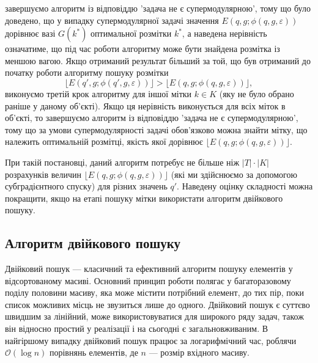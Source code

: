 \begin{enumerate}
\begin{equation}
    \end{equation}
    завершуємо алгоритм із відповіддю 'задача не є супермодулярною', тому що
    було доведено, що у випадку супермодулярної задачі значення $E(q,g;\phi(q,g,\varepsilon))$ дорівнює 
    вазі $G(k^*)$ оптимальної розмітки $k^*$, а наведена нерівність означатиме, що під час роботи алгоритму може бути знайдена 
    розмітка із меншою вагою. Якщо отриманий результат більший за той, що був отриманий до початку роботи алгоритму пошуку розмітки
    \begin{equation}
        \lfloor E(q',g;\phi(q',g,\varepsilon))\rfloor > \lfloor E(q,g;\phi(q,g,\varepsilon))\rfloor, 
    \end{equation}
    виконуємо третій крок алгоритму для іншої мітки $k\in K$ (яку не було обрано раніше у даному об'єкті).
    Якщо ця нерівність виконується для всіх міток в об'єкті, то завершуємо алгоритм із 
    відповіддю 'задача не є супермодулярною', тому що за умови супермодулярності задачі обов'язково можна знайти мітку, що
    належить оптимальній розмітці, якість якої дорівнює $\lfloor E(q,g;\phi(q,g,\varepsilon))\rfloor$.
\end{enumerate}

При такій постановці, даний алгоритм потребує не більше ніж $|T|\cdot|K|$ розрахунків величин 
$\lfloor E(q,g;\phi(q,g,\varepsilon))\rfloor$ (які ми здійснюємо за допомогою субградієнтного спуску) для різних значень $q'$.
Наведену оцінку складності можна покращити, якщо на етапі пошуку мітки використати алгоритм двійкового пошуку.

\subsection{Алгоритм двійкового пошуку}

Двійковий пошук --- класичний та ефективний алгоритм пошуку елементів у відсортованому масиві.
Основний принцип роботи полягає у багаторазовому поділу половини масиву, яка може містити потрібний 
елемент, до тих пір, поки список можливих місць не звузиться лише до одного.
Двійковий пошук є суттєво швидшим за лінійний, може використовуватися для широкого ряду задач, також він відносно простий у реалізації і на сьогодні є
загальновживаним. В найгіршому випадку двійковий пошук працює за логарифмічний час, роблячи $\mathcal{O}(\log n)$ 
порівнянь елементів, де $n$ --- розмір вхідного масиву.

